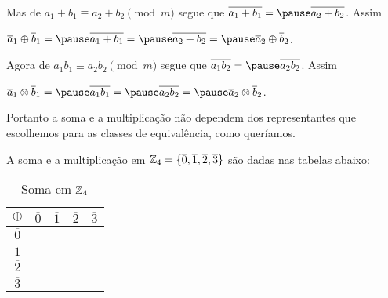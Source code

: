 \documentclass{beamer}
\begin{document}
    \begin{frame}
        Mas de $a_1 + b_1 \equiv a_2 + b_2 \pmod m$ \pause segue que $\overline{a_1 + b_1} =  \pause \overline{a_2 + b_2}$\pause. Assim
        \begin{center}
            $\overline{a}_{1}\oplus \overline{b}_{1} = \pause \overline{a_{1}+b_{1}} = \pause \overline{a_{2} + b_{2}} = \pause \overline{a}_{2}\oplus \overline{b}_{2}$.\pause
        \end{center}

        Agora de $a_1b_1 \equiv a_2b_2 \pmod m$ \pause segue que $\overline{a_1b_2} = \pause \overline{a_2b_2}$\pause. Assim
        \begin{center}
            $\overline{a}_{1}\otimes \overline{b}_{1} = \pause \overline{a_{1}b_{1}} = \pause \overline{a_{2}b_{2}} = \pause \overline{a}_{2}\otimes\overline{b}_{2}$.\pause
        \end{center}

        Portanto a soma e a multiplicação \pause não dependem dos representantes que escolhemos para as classes de equivalência, \pause como queríamos.\hspace{.3cm} \qedsymbol
    \end{frame}

    \begin{frame}
        \begin{exemplo}
            A soma e a multiplica{\c c}{\~a}o em $\mathbb{Z}_4 = \{\overline{0},\overline{1},\overline{2},\overline{3}\}$\pause
            s\~ao dadas nas tabelas abaixo:\pause
                \begin{table}[!htb]
                  \caption{Soma em $\mathbb{Z}_4$}
                  \begin{minipage}{.5\linewidth}
                    \centering
                    \begin{tabular}{|c|c|c|c|c|} 
                        \hline
                        $\oplus$ & $\overline{0}$ & $\overline{1}$ & $\overline{2}$ & $\overline{3}$\T\\
                        \hline
                        $\overline{0}$ & \phantom{abc} & \phantom{abc} & \phantom{abc} & \phantom{abc}\T\\
                        \hline
                        $\overline{1}$ & \phantom{abc} & \phantom{abc}& \phantom{abc} & \phantom{abc}\T\\
                        \hline
                        $\overline{2}$ & \phantom{abc} & \phantom{abc} & \phantom{abc} & \phantom{abc}\T\\
                        \hline
                        $\overline{3}$ & \phantom{abc} & \phantom{abc} & \phantom{abc} & \phantom{abc}\T\\
                        \hline
                    \end{tabular}
                  \end{minipage}
                \end{table}
        \end{exemplo}
    \end{frame}
\end{document}
